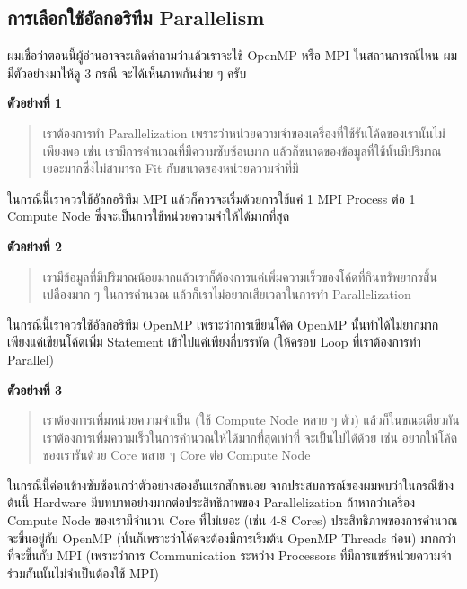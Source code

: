 \subsection{การเลือกใช้อัลกอริทึม Parallelism}

ผมเชื่อว่าตอนนี้ผู้อ่านอาจจะเกิดคำถามว่าแล้วเราจะใช้ OpenMP หรือ MPI ในสถานการณ์ไหน ผมมีตัวอย่างมาให้ดู 3 กรณี จะได้เห็นภาพกันง่าย ๆ ครับ

\noindent \textbf{ตัวอย่างที่ 1}

\begin{quote}
\color{gray}
เราต้องการทำ Parallelization เพราะว่าหน่วยความจำของเครื่องที่ใช้รันโค้ดของเรานั้นไม่เพียงพอ เช่น เรามีการคำนวณที่มีความซับซ้อนมาก 
แล้วก็ขนาดของข้อมูลที่ใช้นั้นมีปริมาณเยอะมากซึ่งไม่สามารถ Fit กับขนาดของหน่วยความจำที่มี
\end{quote}

ในกรณีนี้เราควรใช้อัลกอริทึม MPI แล้วก็ควรจะเริ่มด้วยการใช้แค่ 1 MPI Process ต่อ 1 Compute Node ซึ่งจะเป็นการใช้หน่วยความจำให้ได้มากที่สุด 

\noindent \textbf{ตัวอย่างที่ 2}

\begin{quote}
\color{gray}
เรามีข้อมูลที่มีปริมาณน้อยมากแล้วเราก็ต้องการแค่เพิ่มความเร็วของโค้ดที่กินทรัพยากรสิ้นเปลืองมาก ๆ ในการคำนวณ แล้วก็เราไม่อยากเสียเวลาในการทำ
Parallelization
\end{quote}

ในกรณีนี้เราควรใช้อัลกอริทึม OpenMP เพราะว่าการเขียนโค้ด OpenMP นั้นทำได้ไม่ยากมาก เพียงแค่เขียนโค้ดเพิ่ม Statement เข้าไปแค่เพียงกี่บรรทัด 
(ให้ครอบ Loop ที่เราต้องการทำ Parallel) 

\noindent \textbf{ตัวอย่างที่ 3}

\begin{quote}
\color{gray}
เราต้องการเพิ่มหน่วยความจำเป็น (ใช้ Compute Node หลาย ๆ ตัว) แล้วก็ในขณะเดียวกันเราต้องการเพิ่มความเร็วในการคำนวณให้ได้มากที่สุดเท่าที่%
จะเป็นไปได้ด้วย เช่น อยากให้โค้ดของเรารันด้วย Core หลาย ๆ Core ต่อ Compute Node
\end{quote}

ในกรณีนี้ค่อนข้างซับซ้อนกว่าตัวอย่างสองอันแรกสักหน่อย จากประสบการณ์ของผมพบว่าในกรณีข้างต้นนี้ Hardware มีบทบาทอย่างมากต่อประสิทธิภาพของ 
Parallelization ถ้าหากว่าเครื่อง Compute Node ของเรามีจำนวน Core ที่ไม่เยอะ (เช่น 4-8 Cores) ประสิทธิภาพของการคำนวณจะขึ้นอยู่กับ 
OpenMP (นั่นก็เพราะว่าโค้ดจะต้องมีการเริ่มต้น OpenMP Threads ก่อน) มากกว่าที่จะขึ้นกับ MPI (เพราะว่าการ Communication ระหว่าง Processors 
ที่มีการแชร์หน่วยความจำร่วมกันนั้นไม่จำเป็นต้องใช้ MPI)


